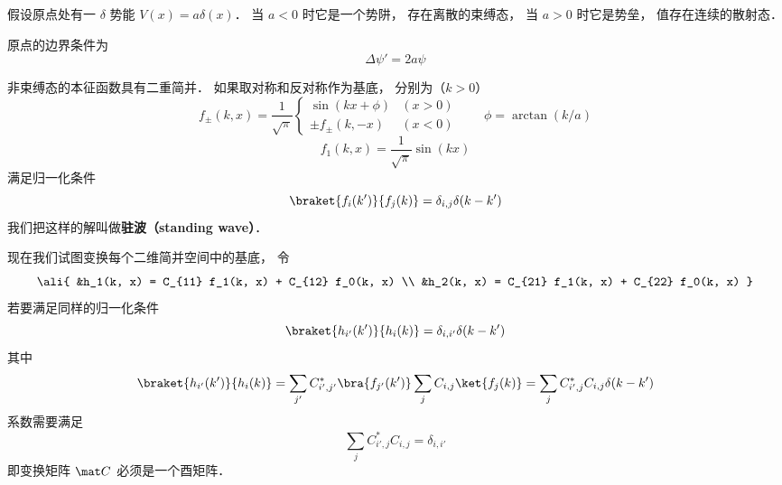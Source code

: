 
\begin{issues}
\issueDraft
\end{issues}


假设原点处有一 $\delta$ 势能 $V(x) = a\delta(x)$． 当 $a < 0$ 时它是一个势阱， 存在离散的束缚态， 当 $a > 0$ 时它是势垒， 值存在连续的散射态．

原点的边界条件为
\begin{equation}
\Delta \psi' = 2a \psi
\end{equation}

非束缚态的本征函数具有二重简并． 如果取对称和反对称作为基底， 分别为（$k > 0$）
\begin{equation}
f_\pm(k, x) = \frac{1}{\sqrt{\pi}}
\begin{cases}
\sin(kx + \phi) & (x > 0)\\
\pm f_\pm(k, -x) & (x < 0)
\end{cases}
\qquad  \phi = \arctan(k/a)
\end{equation}
\begin{equation}
f_1(k, x) = \frac{1}{\sqrt{\pi}}\sin(kx)
\end{equation}
满足归一化条件
\begin{equation}\label{Dsc1D_eq4}
\braket{f_i(k')}{f_j(k)} = \delta_{i,j} \delta(k - k')
\end{equation}
我们把这样的解叫做\textbf{驻波（standing wave）}．

现在我们试图变换每个二维简并空间中的基底， 令
\begin{equation}\ali{
&h_1(k, x) =  C_{11} f_1(k, x) + C_{12} f_0(k, x) \\
&h_2(k, x) =  C_{21} f_1(k, x) + C_{22} f_0(k, x)
}\end{equation}
若要满足同样的归一化条件
\begin{equation}\label{Dsc1D_eq6}
\braket{h_{i'}(k')}{h_i(k)} = \delta_{i,i'}\delta(k - k')
\end{equation}
其中
\begin{equation}
\braket{h_{i'}(k')}{h_i(k)} = \sum_{j'} C_{i',j'}^* \bra{f_{j'}(k')} \sum_j C_{i, j} \ket{f_j(k)} = \sum_j C_{i', j}^* C_{i, j} \delta(k - k')
\end{equation}
系数需要满足
\begin{equation}
 \sum_j C_{i', j}^* C_{i, j} = \delta_{i, i'}
\end{equation}
即变换矩阵 $\mat C$ 必须是一个酉矩阵．

